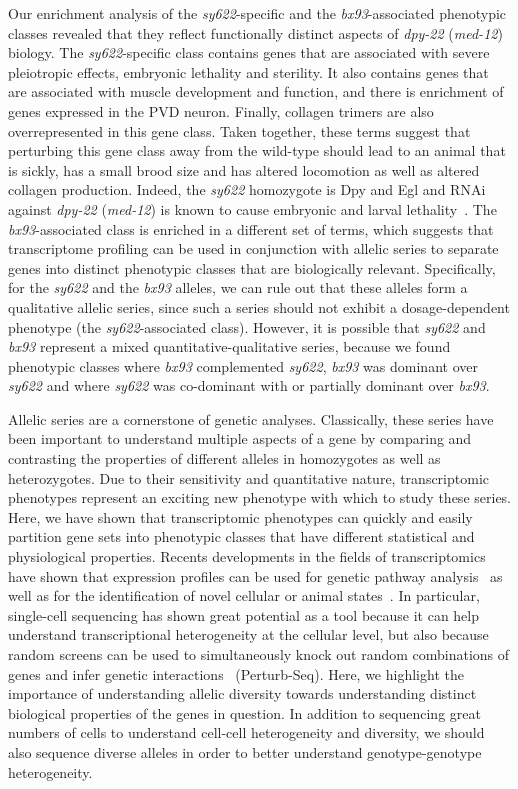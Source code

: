 \documentclass[10pt, onecolumn]{article}
\newcommand{\gene}[1]{\mbox{\emph{#1}}}
\newcommand{\dpy}{\gene{dpy-22} (\emph{med-12})}
\begin{document}
Our enrichment analysis of the \emph{sy622}-specific and the
\emph{bx93}-associated phenotypic classes revealed that they reflect
functionally distinct aspects of \dpy{} biology. The \emph{sy622}-specific class
contains genes that are associated with severe pleiotropic effects, embryonic
lethality and sterility. It also contains genes that are associated with muscle
development and function, and there is enrichment of genes expressed in the PVD
neuron. Finally, collagen trimers are also overrepresented in this gene class.
Taken together, these terms suggest that perturbing this gene class away from
the wild-type should lead to an animal that is sickly, has a small brood size
and has altered locomotion as well as altered collagen production. Indeed, the
\emph{sy622} homozygote is Dpy and Egl and RNAi against \dpy{} is known to cause
embryonic and larval lethality~\cite{}. The \emph{bx93}-associated class is
enriched in a different set of terms, which suggests that transcriptome
profiling can be used in conjunction with allelic series to separate genes into
distinct phenotypic classes that are biologically relevant. Specifically, for
the \emph{sy622} and the \emph{bx93} alleles, we can rule out that these alleles
form a qualitative allelic series, since such a series should not exhibit a
dosage-dependent phenotype (the \emph{sy622}-associated class). However, it is
possible that \emph{sy622} and \emph{bx93} represent a mixed
quantitative-qualitative series, because we found phenotypic classes where
\emph{bx93} complemented \emph{sy622}, \emph{bx93} was dominant over
\emph{sy622} and where \emph{sy622} was co-dominant with or partially dominant
over \emph{bx93}.

Allelic series are a cornerstone of genetic analyses. Classically, these series
have been important to understand multiple aspects of a gene by comparing and
contrasting the properties of different alleles in homozygotes as well as
heterozygotes. Due to their sensitivity and quantitative nature, transcriptomic
phenotypes represent an exciting new phenotype with which to study these series.
Here, we have shown that transcriptomic phenotypes can quickly and easily
partition gene sets into phenotypic classes that have different statistical and
physiological properties. Recents developments in the fields of transcriptomics
have shown that expression profiles can be used for genetic pathway
analysis~\cite{} as well as for the identification of novel cellular or animal
states~\cite{}. In particular, single-cell sequencing has shown great
potential as a tool because it can help understand transcriptional heterogeneity
at the cellular level, but also because random screens can be used to
simultaneously knock out random combinations of genes and infer genetic
interactions~\cite{} (Perturb-Seq). Here, we highlight the importance of
understanding allelic diversity towards understanding distinct biological
properties of the genes in question. In addition to sequencing great numbers of
cells to understand cell-cell heterogeneity and diversity, we should also
sequence diverse alleles in order to better understand genotype-genotype
heterogeneity.
\end{document}
